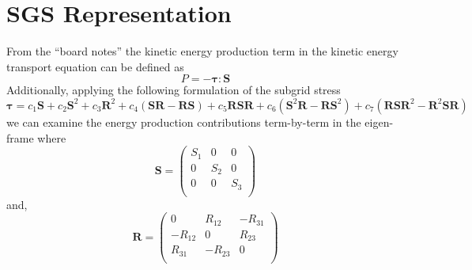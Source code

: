 \newcommand{\sgsvec}{\mathbf{\tau}} 
\newcommand{\svec}{\mathbf{S}}
\newcommand{\rvec}{\mathbf{R}}
\section{SGS Representation}
From the ``board notes'' the kinetic energy production term in the kinetic
energy transport equation can be defined as
\begin{equation}
    P =  - \sgsvec:\svec
\end{equation}
Additionally, applying the following  formulation of the subgrid stress 
\begin{equation}
    \sgsvec = c_{1} \svec + c_{2} \svec^2 + c_{3} \rvec^2
                + c_{4} \left(\svec \rvec - \rvec \svec \right)
                + c_{5} \rvec \svec \rvec 
                + c_{6} \left(\svec^2 \rvec - \rvec \svec^2 \right)
                + c_{7} \left( \rvec \svec \rvec^2 - \rvec^2 \svec \rvec \right) 
\end{equation}
we can examine the energy production contributions term-by-term in the 
eigen-frame where
\begin{equation}
    \svec =
    \begin{pmatrix}
        S_{1}      & 0         & 0         \\
        0           & S_{2}    & 0         \\
        0           & 0         & S_{3}    \\
    \end{pmatrix}
    \label{eq:Sij}
\end{equation}
and,
\begin{equation}
    \rvec =
    \begin{pmatrix}
        0           & R_{12}    & -R_{31}   \\
        -R_{12}     & 0         & R_{23}    \\
        R_{31}      & -R_{23}   & 0         \\
    \end{pmatrix}
\end{equation}








